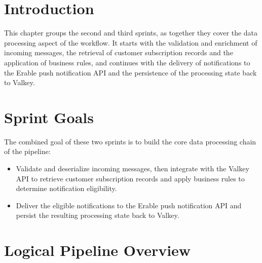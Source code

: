
\section{Introduction}
This chapter groups the second and third sprints, as together they cover the data processing aspect of the workflow. It starts with the validation and enrichment of incoming messages, the retrieval of customer subscription records and the application of business rules, and continues with the delivery of notifications to the Erable push notification API and the persistence of the processing state back to Valkey.

\section{Sprint Goals}
The combined goal of these two sprints is to build the core data processing chain of the pipeline:
\begin{itemize}
    \item[-] Validate and deserialize incoming messages, then integrate with the Valkey API to retrieve customer subscription records and apply business rules to determine notification eligibility.
    \item[-] Deliver the eligible notifications to the Erable push notification API and persist the resulting processing state back to Valkey.
\end{itemize}

\section{Logical Pipeline Overview}

\begin{center}
    \centering
    \label{fig:logical-pipeline}
\end{center}

